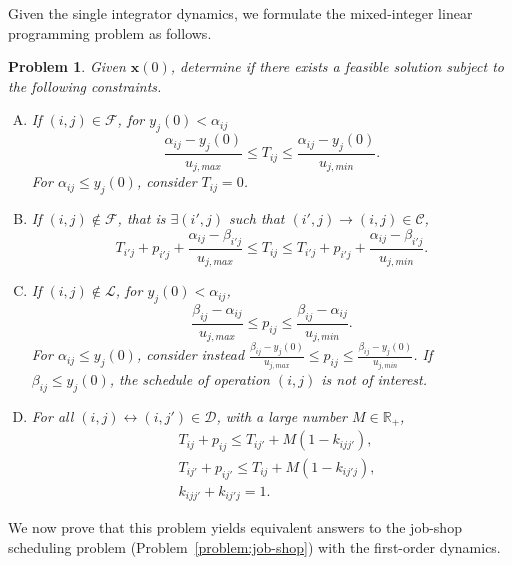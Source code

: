 \documentclass{sig-alternate}
\newtheorem{problem}{Problem}
\begin{document}
Given the single integrator dynamics, we formulate the mixed-integer linear programming problem as follows.

\begin{problem}\label{problem:milp}
	Given $\mathbf{x}(0)$, determine if there exists a feasible solution subject to the following constraints.
	
\begin{enumerate}[A.]
	\item If $(i,j)\in \mathcal{F}$, for $y_j(0)<\alpha_{ij}$
	$$\frac{\alpha_{ij}-y_j(0)}{u_{j,max}}\leq T_{ij}\leq \frac{\alpha_{ij}-y_j(0)}{u_{j,min}}.$$
	\label{constraint1:firstoperation}
	For $\alpha_{ij}\leq y_j(0)$, consider $T_{ij}=0$.
	\item If $(i,j)\notin \mathcal{F}$, that is $\exists (i',j)$ such that $(i',j)\rightarrow (i,j)\in\mathcal{C}$,
	$$T_{i'j}+p_{i'j}+\frac{\alpha_{ij}-\beta_{i'j}}{u_{j,max}}\leq T_{ij}\leq T_{i'j}+p_{i'j}+\frac{\alpha_{ij}-\beta_{i'j}}{u_{j,min}}.$$
	\label{constraint2:sequential}
	
	\item If $(i,j)\notin \mathcal{L}$, for $y_j(0)<\alpha_{ij}$,
	$$\frac{\beta_{ij}-\alpha_{ij}}{u_{j,max}}\leq p_{ij}\leq \frac{\beta_{ij}-\alpha_{ij}}{u_{j,min}}.$$
	\label{constraint3:process}
	For $\alpha_{ij}\leq y_j(0)$, consider instead $\frac{\beta_{ij}-y_j(0)}{u_{j,max}}\leq p_{ij}\leq \frac{\beta_{ij}-y_{j}(0)}{u_{j,min}}$. If $\beta_{ij}\leq y_j(0)$, the schedule of operation $(i,j)$ is not of interest.
	
	\item For all $(i,j)\leftrightarrow (i,j')\in\mathcal{D}$, with a large number $M\in\mathbb{R}_+$,
	\begin{align*}
	&T_{ij}+p_{ij}\leq T_{ij'}+M(1-k_{ijj'}),\\
	&T_{ij'}+p_{ij'}\leq T_{ij} + M(1-k_{ij'j}),\\
	&k_{ijj'}+k_{ij'j} = 1.
	\end{align*}
	\label{constraint4:disjunctive}
\end{enumerate}
\end{problem}

We now prove that this problem yields equivalent answers to the job-shop scheduling problem (Problem~\ref{problem:job-shop}) with the first-order dynamics.
\end{document}
